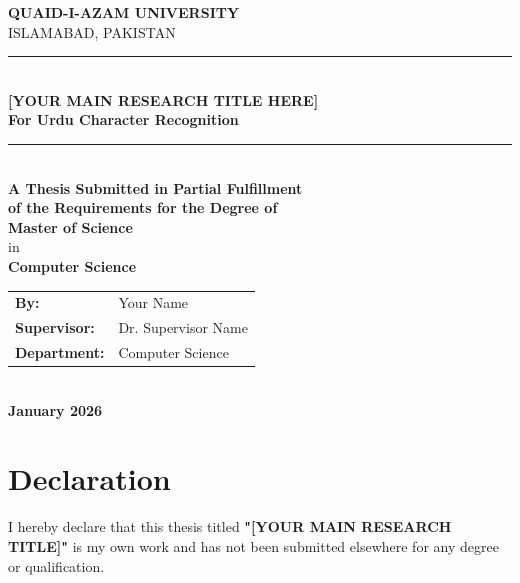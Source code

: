 \documentclass[12pt,a4paper,oneside]{report}
\begin{document}
\begin{titlepage}
    \centering
    \vspace*{1cm}
    
    {\Large\textbf{QUAID-I-AZAM UNIVERSITY}}\\[0.3cm]
    {\large ISLAMABAD, PAKISTAN}\\[2cm]
    
    \rule{\textwidth}{1.5pt}\\[0.5cm]
    {\huge\bfseries [YOUR MAIN RESEARCH TITLE HERE]\\[0.3cm]
    For Urdu Character Recognition}\\[0.5cm]
    \rule{\textwidth}{1.5pt}\\[2cm]
    
    {\Large\textbf{A Thesis Submitted in Partial Fulfillment}}\\[0.2cm]
    {\Large\textbf{of the Requirements for the Degree of}}\\[1cm]
    
    {\Large\textbf{Master of Science}}\\[0.3cm]
    {\Large in}\\[0.3cm]
    {\Large\textbf{Computer Science}}\\[2cm]
    
    \begin{tabular}{ll}
        \textbf{By:} & Your Name \\
        \textbf{Supervisor:} & Dr. Supervisor Name \\
        \textbf{Department:} & Computer Science \\
    \end{tabular}\\[2cm]
    
    {\large\textbf{January 2026}}
    
\end{titlepage}

\chapter*{Declaration}

I hereby declare that this thesis titled \textbf{"[YOUR MAIN RESEARCH TITLE]"} is my own work and has not been submitted elsewhere for any degree or qualification.
\end{document}
